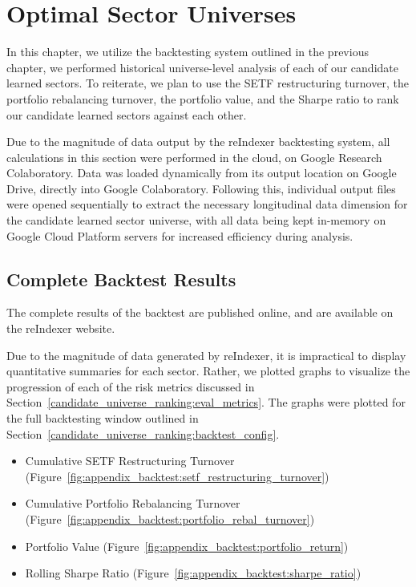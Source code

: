 \documentclass[../main.tex]{subfiles}
\begin{document}
    
\chapter{Optimal Sector Universes} \label{optimal_sector_universes}


In this chapter, we utilize the backtesting system outlined in the previous chapter, we performed historical universe-level analysis of each of our candidate learned sectors. To reiterate, we plan to use the SETF restructuring turnover, the portfolio rebalancing turnover, the portfolio value, and the Sharpe ratio to rank our candidate learned sectors against each other.

Due to the magnitude of data output by the reIndexer backtesting system, all calculations in this section were performed in the cloud, on Google Research Colaboratory. Data was loaded dynamically from its output location on Google Drive, directly into Google Colaboratory. Following this, individual output files were opened sequentially to extract the necessary longitudinal data dimension for the candidate learned sector universe, with all data being kept in-memory on Google Cloud Platform servers for increased efficiency during analysis.

\section{Complete Backtest Results}

The complete results of the backtest are published online, and are available on the reIndexer website.

Due to the magnitude of data generated by reIndexer, it is impractical to display quantitative summaries for each sector. Rather, we plotted graphs to visualize the progression of each of the risk metrics discussed in Section~\ref{candidate_universe_ranking:eval_metrics}. The graphs were plotted for the full backtesting window outlined in Section~\ref{candidate_universe_ranking:backtest_config}.

\begin{itemize}
    \item Cumulative SETF Restructuring Turnover (Figure~\ref{fig:appendix_backtest:setf_restructuring_turnover})
    \item Cumulative Portfolio Rebalancing Turnover (Figure~\ref{fig:appendix_backtest:portfolio_rebal_turnover})
    \item Portfolio Value (Figure~\ref{fig:appendix_backtest:portfolio_return})
    \item Rolling Sharpe Ratio (Figure~\ref{fig:appendix_backtest:sharpe_ratio})
\end{itemize}
\end{document}
